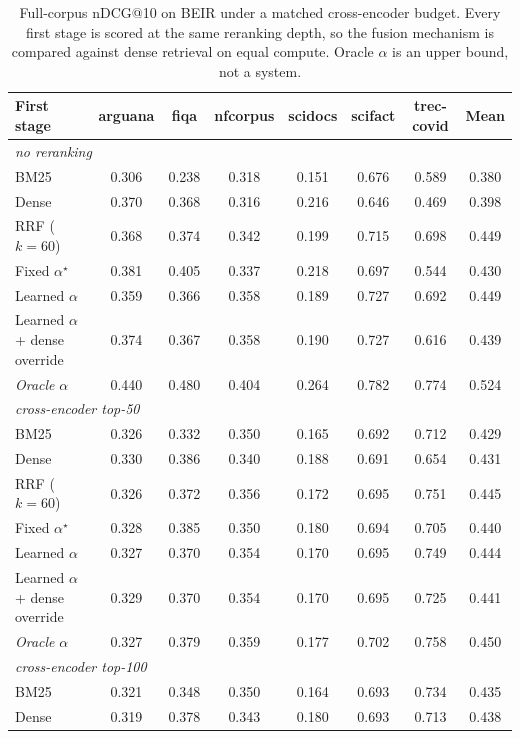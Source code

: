 \begin{table}[t]
\centering
\small
\caption{Full-corpus nDCG@10 on BEIR under a matched cross-encoder budget. Every first stage is scored at the same reranking depth, so the fusion mechanism is compared against dense retrieval on equal compute. Oracle $\alpha$ is an upper bound, not a system.}
\label{tab:main_retrieval}
\begin{tabular}{lccccccc}
\toprule
First stage & arguana & fiqa & nfcorpus & scidocs & scifact & trec-covid & Mean \\
\midrule
\multicolumn{8}{l}{\textit{no reranking}} \\
BM25 & 0.306 & 0.238 & 0.318 & 0.151 & 0.676 & 0.589 & 0.380 \\
Dense & 0.370 & 0.368 & 0.316 & 0.216 & 0.646 & 0.469 & 0.398 \\
RRF ($k{=}60$) & 0.368 & 0.374 & 0.342 & 0.199 & 0.715 & 0.698 & 0.449 \\
Fixed $\alpha^\star$ & 0.381 & 0.405 & 0.337 & 0.218 & 0.697 & 0.544 & 0.430 \\
Learned $\alpha$ & 0.359 & 0.366 & 0.358 & 0.189 & 0.727 & 0.692 & 0.449 \\
Learned $\alpha$ + dense override & 0.374 & 0.367 & 0.358 & 0.190 & 0.727 & 0.616 & 0.439 \\
\textit{Oracle} $\alpha$ & 0.440 & 0.480 & 0.404 & 0.264 & 0.782 & 0.774 & 0.524 \\
\midrule
\multicolumn{8}{l}{\textit{cross-encoder top-50}} \\
BM25 & 0.326 & 0.332 & 0.350 & 0.165 & 0.692 & 0.712 & 0.429 \\
Dense & 0.330 & 0.386 & 0.340 & 0.188 & 0.691 & 0.654 & 0.431 \\
RRF ($k{=}60$) & 0.326 & 0.372 & 0.356 & 0.172 & 0.695 & 0.751 & 0.445 \\
Fixed $\alpha^\star$ & 0.328 & 0.385 & 0.350 & 0.180 & 0.694 & 0.705 & 0.440 \\
Learned $\alpha$ & 0.327 & 0.370 & 0.354 & 0.170 & 0.695 & 0.749 & 0.444 \\
Learned $\alpha$ + dense override & 0.329 & 0.370 & 0.354 & 0.170 & 0.695 & 0.725 & 0.441 \\
\textit{Oracle} $\alpha$ & 0.327 & 0.379 & 0.359 & 0.177 & 0.702 & 0.758 & 0.450 \\
\midrule
\multicolumn{8}{l}{\textit{cross-encoder top-100}} \\
BM25 & 0.321 & 0.348 & 0.350 & 0.164 & 0.693 & 0.734 & 0.435 \\
Dense & 0.319 & 0.378 & 0.343 & 0.180 & 0.693 & 0.713 & 0.438 \\

\end{tabular}
\end{table}

